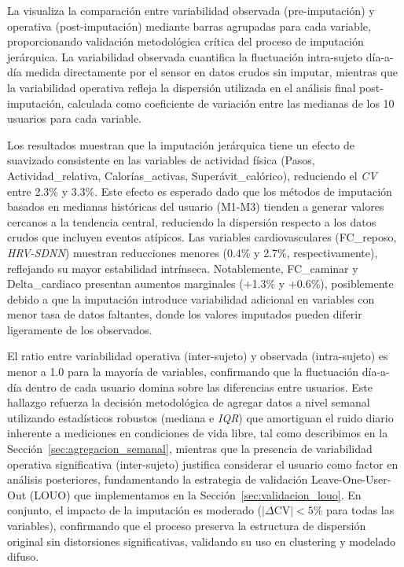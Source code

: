 \FloatBarrier

La  visualiza la comparación entre variabilidad observada (pre-imputación) y operativa (post-imputación) mediante barras agrupadas para cada variable, proporcionando validación metodológica crítica del proceso de imputación jerárquica. La variabilidad observada cuantifica la fluctuación intra-sujeto día-a-día medida directamente por el sensor en datos crudos sin imputar, mientras que la variabilidad operativa refleja la dispersión utilizada en el análisis final post-imputación, calculada como coeficiente de variación entre las medianas de los 10 usuarios para cada variable.

Los resultados muestran que la imputación jerárquica tiene un efecto de suavizado consistente en las variables de actividad física (Pasos, Actividad\_relativa, Calorías\_activas, Superávit\_calórico), reduciendo el \textit{CV} entre 2.3\% y 3.3\%. Este efecto es esperado dado que los métodos de imputación basados en medianas históricas del usuario (M1-M3) tienden a generar valores cercanos a la tendencia central, reduciendo la dispersión respecto a los datos crudos que incluyen eventos atípicos. Las variables cardiovasculares (FC\_reposo, \textit{HRV-SDNN}) muestran reducciones menores (0.4\% y 2.7\%, respectivamente), reflejando su mayor estabilidad intrínseca. Notablemente, FC\_caminar y Delta\_cardiaco presentan aumentos marginales (+1.3\% y +0.6\%), posiblemente debido a que la imputación introduce variabilidad adicional en variables con menor tasa de datos faltantes, donde los valores imputados pueden diferir ligeramente de los observados.

El ratio entre variabilidad operativa (inter-sujeto) y observada (intra-sujeto) es menor a 1.0 para la mayoría de variables, confirmando que la fluctuación día-a-día dentro de cada usuario domina sobre las diferencias entre usuarios. Este hallazgo refuerza la decisión metodológica de agregar datos a nivel semanal utilizando estadísticos robustos (mediana e \textit{IQR}) que amortiguan el ruido diario inherente a mediciones en condiciones de vida libre, tal como describimos en la Sección~\ref{sec:agregacion_semanal}, mientras que la presencia de variabilidad operativa significativa (inter-sujeto) justifica considerar el usuario como factor en análisis posteriores, fundamentando la estrategia de validación Leave-One-User-Out (LOUO) que implementamos en la Sección~\ref{sec:validacion_louo}. En conjunto, el impacto de la imputación es moderado ($|\Delta\text{CV}| < 5\%$ para todas las variables), confirmando que el proceso preserva la estructura de dispersión original sin distorsiones significativas, validando su uso en clustering y modelado difuso.

